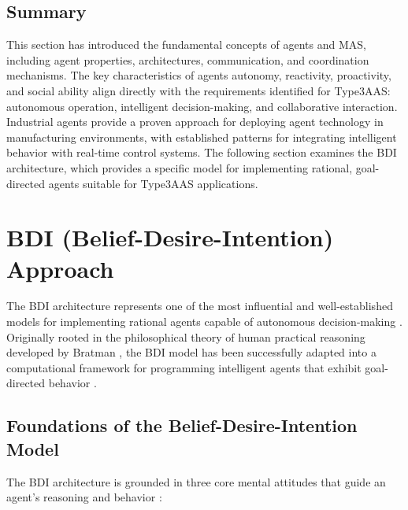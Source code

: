 \subsection{Summary}
\label{subsec:mas_summary}

This section has introduced the fundamental concepts of agents and \ac{MAS}, including agent properties, architectures, communication, and coordination mechanisms. The key characteristics of agents autonomy, reactivity, proactivity, and social ability align directly with the requirements identified for \ac{Type3AAS}: autonomous operation, intelligent decision-making, and collaborative interaction. Industrial agents provide a proven approach for deploying agent technology in manufacturing environments, with established patterns for integrating intelligent behavior with real-time control systems. The following section examines the \ac{BDI} architecture, which provides a specific model for implementing rational, goal-directed agents suitable for \ac{Type3AAS} applications.



\newpage
\section{BDI (Belief-Desire-Intention) Approach}
\label{sec:bdi}
The \ac{BDI} architecture represents one of the most influential and well-established models for implementing rational agents capable of autonomous decision-making \cite{wooldridge1995intelligent}. Originally rooted in the philosophical theory of human practical reasoning developed by Bratman \cite{bratman1987intention}, the \ac{BDI} model has been successfully adapted into a computational framework for programming intelligent agents that exhibit goal-directed behavior \cite{rao1995bdi}.
\subsection{Foundations of the Belief-Desire-Intention Model}

The \ac{BDI} architecture is grounded in three core mental attitudes that guide an agent's reasoning and behavior \cite{bratman1987intention}:


